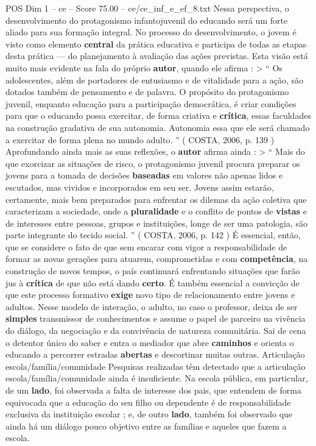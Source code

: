 \begin{textsample}{POS Dim 1 – ce – Score 75.00 – ce/ce\_inf\_e\_ef\_8.txt}
Nessa perspectiva, o desenvolvimento do protagonismo infantojuvenil do educando será um forte aliado para sua formação integral.
No processo do desenvolvimento, o jovem é visto como elemento \textbf{central} da prática educativa e participa de todas as etapas desta prática — do planejamento à avaliação das ações previstas.
Esta visão está muito mais evidente na fala do próprio \textbf{autor}, quando ele afirma : > “ Os adolescentes, além de portadores de entusiasmo e de vitalidade para a ação, são dotados também de pensamento e de palavra.
O propósito do protagonismo juvenil, enquanto educação para a participação democrática, é criar condições para que o educando possa exercitar, de forma criativa e \textbf{crítica}, essas faculdades na construção gradativa de sua autonomia.
Autonomia essa que ele será chamado a exercitar de forma plena no mundo adulto. ” ( COSTA, 2006, p. 139 ) Aprofundando ainda mais as suas reflexões, o \textbf{autor} afirma ainda : > “ Mais do que exorcizar as situações de risco, o protagonismo juvenil procura preparar os jovens para a tomada de decisões \textbf{baseadas} em valores não apenas lidos e escutados, mas vividos e incorporados em seu ser.
Jovens assim estarão, certamente, mais bem preparados para enfrentar os dilemas da ação coletiva que caracterizam a sociedade, onde a \textbf{pluralidade} e o conflito de pontos de \textbf{vistas} e de interesses entre pessoas, grupos e instituições, longe de ser uma patologia, são parte integrante do tecido social. ” ( COSTA, 2006, p. 142 ) É essencial, então, que se considere o fato de que sem encarar com vigor a responsabilidade de formar as novas gerações para atuarem, comprometidas e com \textbf{competência}, na construção de novos tempos, o país continuará enfrentando situações que farão jus à \textbf{crítica} de que não está dando \textbf{certo}.
É também essencial a convicção de que este processo formativo \textbf{exige} novo tipo de relacionamento entre jovens e adultos.
Nesse modelo de interação, o adulto, no caso o professor, deixa de ser \textbf{simples} transmissor de conhecimentos e assume o papel de parceiro na vivência do diálogo, da negociação e da convivência de natureza comunitária.
Sai de cena o detentor único do saber e entra o mediador que abre \textbf{caminhos} e orienta o educando a percorrer estradas \textbf{abertas} e descortinar muitas outras.
Articulação escola/família/comunidade Pesquisas realizadas têm detectado que a articulação escola/família/comunidade ainda é insuficiente.
Na escola pública, em particular, de um \textbf{lado}, foi observada a falta de interesse dos pais, que entendem de forma equivocada que a educação do seu filho ou dependente é de responsabilidade exclusiva da instituição escolar ; e, de outro \textbf{lado}, também foi observado que ainda há um diálogo pouco objetivo entre as famílias e aqueles que fazem a escola.

\end{textsample}
